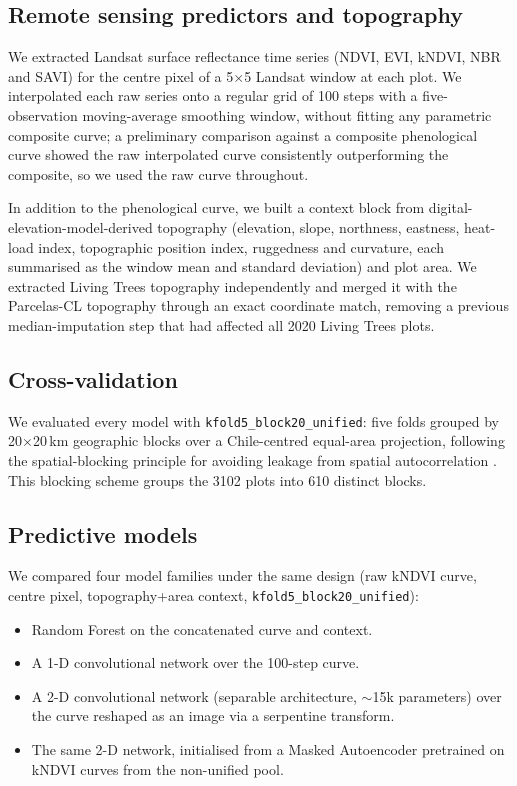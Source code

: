 \documentclass[11pt]{article}
\begin{document}
\subsection{Remote sensing predictors and topography}

We extracted Landsat surface reflectance time series (NDVI, EVI, kNDVI, NBR and SAVI)
for the centre pixel of a 5$\times$5 Landsat window at each plot. We interpolated each
raw series onto a regular grid of 100 steps with a five-observation moving-average
smoothing window, without fitting any parametric composite curve; a preliminary
comparison against a composite phenological curve showed the raw interpolated curve
consistently outperforming the composite, so we used the raw curve throughout.

In addition to the phenological curve, we built a context block from
digital-elevation-model-derived topography (elevation, slope, northness, eastness,
heat-load index, topographic position index, ruggedness and curvature, each summarised
as the window mean and standard deviation) and plot area. We extracted Living Trees
topography independently and merged it with the Parcelas-CL topography through an exact
coordinate match, removing a previous median-imputation step that had affected all 2020
Living Trees plots.

\subsection{Cross-validation}

We evaluated every model with \texttt{kfold5\_block20\_unified}: five folds grouped by
20$\times$20\,km geographic blocks over a Chile-centred equal-area projection, following
the spatial-blocking principle for avoiding leakage from spatial autocorrelation
\citep{roberts2017crossvalidation}. This blocking scheme groups the 3102 plots into 610
distinct blocks.

\subsection{Predictive models}

We compared four model families under the same design (raw kNDVI curve, centre pixel,
topography+area context, \texttt{kfold5\_block20\_unified}):

\begin{itemize}
  \item Random Forest \citep{breiman2001random} on the concatenated curve and context.
  \item A 1-D convolutional network over the 100-step curve.
  \item A 2-D convolutional network (separable architecture, $\sim$15k parameters) over
    the curve reshaped as an image via a serpentine transform.
  \item The same 2-D network, initialised from a Masked Autoencoder
    \citep{he2022masked} pretrained on kNDVI curves from the non-unified pool.
\end{itemize}
\end{document}
